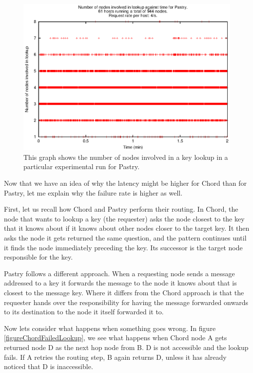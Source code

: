 \begin{figure}[!htbp]
  \begin{center}
    \includegraphics[width=0.9\linewidth]{illustrations/nodes_against_time_pastry.eps}
    \caption{This graph shows the number of nodes involved in a key lookup in a particular experimental run for Pastry.}
    \label{figPastryNumNodes}
  \end{center}
\end{figure}

\mbox{}
Now that we have an idea of why the latency might be higher for Chord than for Pastry, let me explain why the failure rate is higher as well.

First, let us recall how Chord and Pastry perform their routing.
In Chord, the node that wants to lookup a key (the requester) asks the node closest to the key that it knows about if it knows about other nodes closer to the target key. It then asks the node it gets returned the same question, and the pattern continues until it finds the node immediately preceding the key. Its successor is the target node responsible for the key.

Pastry follows a different approach. When a requesting node sends a message addressed to a key it forwards the message to the node it knows about that is closest to the message key. Where it differs from the Chord approach is that the requester hands over the responsibility for having the message forwarded onwards to its destination to the node it itself forwarded it to.

Now lets consider what happens when something goes wrong.
In figure \ref{figureChordFailedLookup}, we see what happens when Chord node A gets returned node D as the next hop node from B. D is not accessible and the lookup fails. If A retries the routing step, B again returns D, unless it has already noticed that D is inaccessible.

